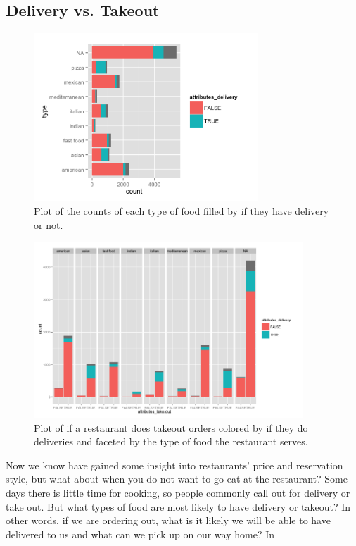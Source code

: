 \documentclass[11pt]{article}
\begin{document}
\subsection{Delivery vs. Takeout}

\begin{figure}[h!]
  \caption{Plot of the counts of each type of food filled by if they have delivery or not.}
  \centering
  \label{delivery}
    \includegraphics[width=0.75\textwidth]{Figures/delivery.png}
\end{figure}
\begin{figure}[h!]
  \caption{Plot of if a restaurant does takeout orders colored by if they do deliveries and faceted by the type of food the restaurant serves.}
  \centering
  \label{takeout}
    \includegraphics[width=0.9\textwidth]{Figures/takeoutdelivery.png}
\end{figure}
Now we know have gained some insight into restaurants' price and reservation style, but what about when you do not want to go eat at the restaurant? Some days there is little time for cooking, so people commonly call out for delivery or take out.  But what types of food are most likely to have delivery or takeout?  In other words, if we are ordering out, what is it likely we will be able to have delivered to us and what can we pick up on our way home? In 
\end{document}
